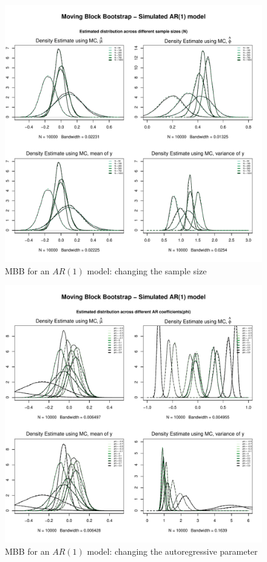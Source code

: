 \documentclass{article}
\begin{document}
\clearpage

\begin{figure}[hbt!]
\includegraphics[width=\textwidth]{plots/MBB_AR1_densities_diff_smpl}
\caption{MBB for an $AR(1)$ model: changing the sample size}
\label{fig:MBB_AR1_densities_diff_smpl}
\centering
\end{figure}

\begin{figure}[hbt!]
\includegraphics[width=\textwidth]{plots/MBB_AR1_densities_diff_ARq}
\caption{MBB for an $AR(1)$ model: changing the autoregressive parameter}
\label{fig:MBB_AR1_densities_diff_ARq}
\centering
\end{figure}
\end{document}
